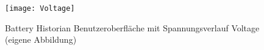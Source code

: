 \begin{figure}
\begin{center}
	\texttt{[image: Voltage]}
	\caption{Battery Historian Benutzeroberfläche mit Spannungsverlauf \glqq Voltage\grqq{} (eigene Abbildung)}
	\label{fig:Voltage} 
\end{center}
\end{figure}
